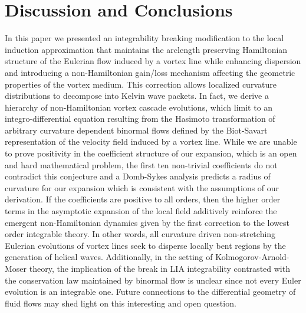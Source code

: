 \documentclass[aps,graphicx,reprint,onecolumn,12pt,tightenlines,longbibliography]{revtex4-1}
\newcommand{\sas}[2]{{#2}}
\begin{document}
{\section{\label{sec:conclusions} Discussion and Conclusions}

In this paper we present\sas{}{ed} an integrability breaking modification to the local induction approximation that maintains the \sas{Killing symmetry}{arclength preserving Hamiltonian structure} of the Eulerian flow induced by a vortex line while enhancing dispersion and introducing a non-Hamiltonian gain/loss mechanism affecting the geometric properties of the vortex medium.  This correction allows localized curvature distributions to decompose into Kelvin wave packets. In fact, we derive a hierarchy of non-Hamiltonian vortex cascade evolutions, which limit to an integro-differential equation resulting from the Hasimoto transformation of arbitrary curvature dependent binormal flows defined by the Biot-Savart representation of the velocity field induced by a vortex line. While we are unable to prove positivity in the coefficient structure of our expansion, which is an open and hard mathematical problem, the first ten non-trivial coefficients do not contradict this  conjecture and a Domb-Sykes analysis predicts a radius of curvature for our expansion which is consistent with the assumptions of our derivation. If the coefficients are positive to all orders, then the higher order terms in the asymptotic expansion of the local field additively reinforce the emergent non-Hamiltonian dynamics given by the first correction to the lowest order integrable theory. In other words, all curvature driven non-stretching Eulerian evolutions of vortex lines seek to disperse locally bent regions by the generation of helical waves. \sas{}{Additionally, in the setting of Kolmogorov-Arnold-Moser theory, the implication of the break in LIA integrability contrasted with the conservation law maintained by binormal flow is unclear since not every Euler evolution is an integrable one. Future connections to the differential geometry of fluid flows may shed light on this interesting and open question.}

}
\end{document}
